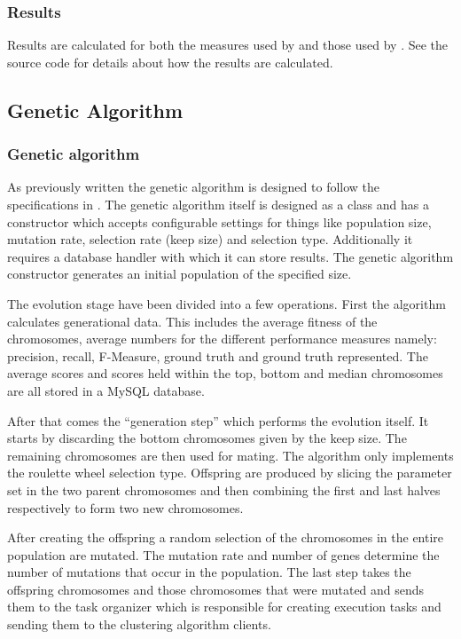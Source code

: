 \subsubsection{Results}
Results are calculated for both the measures used by \supervisor and those used by \citeauthor{Oren1998}. See the source code for details about how the results are calculated.

\subsection{Genetic Algorithm}

\subsubsection{Genetic algorithm}
As previously written the genetic algorithm is designed to follow the specifications in \cite{Goldberg1989,Negnevitsky2002,Haupt2004a}. The genetic algorithm itself is designed as a class and has a constructor which accepts configurable settings for things like population size, mutation rate, selection rate (keep size) and selection type. Additionally it requires a database handler with which it can store results. The genetic algorithm constructor generates an initial population of the specified size.

The evolution stage have been divided into a few operations. First the algorithm calculates generational data. This includes the average fitness of the chromosomes, average numbers for the different performance measures namely: precision, recall, F-Measure, ground truth and ground truth represented. The average scores and scores held within the top, bottom and median chromosomes are all stored in a MySQL database.

After that comes the ``generation step'' which performs the evolution itself. It starts by discarding the bottom chromosomes given by the keep size. The remaining chromosomes are then used for mating. The algorithm only implements the roulette wheel selection type. Offspring are produced by slicing the parameter set in the two parent chromosomes and then combining the first and last halves respectively to form two new chromosomes.

After creating the offspring a random selection of the chromosomes in the entire population are mutated. The mutation rate and number of genes determine the number of mutations that occur in the population. The last step takes the offspring chromosomes and those chromosomes that were mutated and sends them to the task organizer which is responsible for creating execution tasks and sending them to the clustering algorithm clients.

